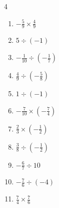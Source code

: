 \begin{multicols}{4}
\begin{enumerate}

  \item $\displaystyle -\frac{5}{9}\times{}\frac{4}{9}$


  \item $\displaystyle 5\div{}\left(-1\right)$

        \phantom{$\displaystyle =-5$}

  \item $\displaystyle -\frac{1}{10}\div{}\left(-\frac{1}{7}\right)$


\columnbreak %

  \item $\displaystyle \frac{4}{9}\div{}\left(-\frac{5}{8}\right)$


  \item $\displaystyle 1\div{}\left(-1\right)$

        \phantom{$\displaystyle =-1$}

  \item $\displaystyle -\frac{7}{10}\times{}\left(-\frac{7}{4}\right)$


  \item $\displaystyle \frac{2}{3}\times{}\left(-\frac{1}{2}\right)$


  \item $\displaystyle \frac{3}{8}\div{}\left(-\frac{1}{2}\right)$


  \item $\displaystyle -\frac{6}{7}\div{}10$


  \item $\displaystyle -\frac{7}{6}\div{}\left(-4\right)$


  \item $\displaystyle \frac{7}{4}\times{}\frac{7}{6}$



\end{enumerate}
\end{multicols}
